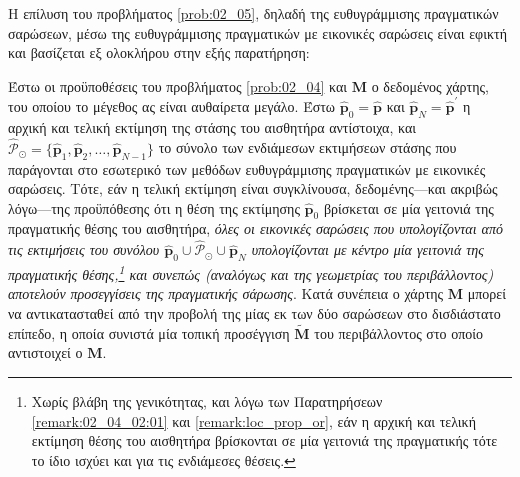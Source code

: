 Η επίλυση του προβλήματος \ref{prob:02_05}, δηλαδή της ευθυγράμμισης
πραγματικών σαρώσεων, μέσω της ευθυγράμμισης πραγματικών με εικονικές σαρώσεις
είναι εφικτή και βασίζεται εξ ολοκλήρου στην εξής παρατήρηση:

\begin{gg_box}
\begin{remark}
Έστω οι προϋποθέσεις του προβλήματος \ref{prob:02_04} και $\bm{M}$ ο δεδομένος
χάρτης, του οποίου το μέγεθος ας είναι αυθαίρετα μεγάλο. Έστω $\hat{\bm{p}}_0 =
\hat{\bm{p}}$ και $\hat{\bm{p}}_N = \hat{\bm{p}}^\prime$ η αρχική και τελική
εκτίμηση της στάσης του αισθητήρα αντίστοιχα, και $\hat{\mathcal{P}}_\odot =
\{\hat{\bm{p}}_1, \hat{\bm{p}}_2,\dots, \hat{\bm{p}}_{N-1}\}$ το σύνολο των
ενδιάμεσων εκτιμήσεων στάσης που παράγονται στο εσωτερικό των μεθόδων
ευθυγράμμισης πραγματικών με εικονικές σαρώσεις. Τότε, εάν η τελική εκτίμηση
είναι συγκλίνουσα, δεδομένης---και ακριβώς λόγω---της προϋπόθεσης ότι η θέση
της εκτίμησης $\hat{\bm{p}}_0$ βρίσκεται σε μία γειτονιά της πραγματικής θέσης
του αισθητήρα, \textit{όλες οι εικονικές σαρώσεις που υπολογίζονται από τις
εκτιμήσεις του συνόλου $\hat{\bm{p}}_0 \cup \hat{\mathcal{P}}_\odot \cup
\hat{\bm{p}}_N$ υπολογίζονται με κέντρο μία γειτονιά της πραγματικής
θέσης,\footnote{Χωρίς βλάβη της γενικότητας, και λόγω των Παρατηρήσεων
\ref{remark:02_04_02:01} και \ref{remark:loc_prop_or}, εάν η αρχική και τελική
εκτίμηση θέσης του αισθητήρα βρίσκονται σε μία γειτονιά της πραγματικής τότε
το ίδιο ισχύει και για τις ενδιάμεσες θέσεις.} και συνεπώς (αναλόγως και της
γεωμετρίας του περιβάλλοντος) αποτελούν προσεγγίσεις της πραγματικής σάρωσης}.
Κατά συνέπεια ο χάρτης $\bm{M}$ μπορεί να αντικατασταθεί από την προβολή της
μίας εκ των δύο σαρώσεων στο δισδιάστατο επίπεδο, η οποία συνιστά μία τοπική
προσέγγιση $\widetilde{\bm{M}}$ του περιβάλλοντος στο οποίο αντιστοιχεί ο
$\bm{M}$.
\end{remark}
\end{gg_box}

